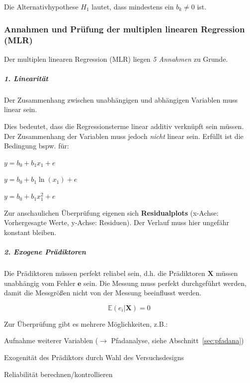 \documentclass{article}
\numberwithin{equation}{section}
\begin{document}
Die Alternativhypothese $H_1$ lautet, dass mindestens ein $b_k \neq 0$ ist.


\subsubsection{Annahmen und Prüfung der multiplen linearen Regression (MLR)}
\label{sec:annahmen-alm}

Der multiplen linearen Regression (MLR) liegen \emph{5 Annahmen} zu Grunde.

\subparagraph{1. Linearität}

Der Zusammenhang zwischen unabhängigen und abhängigen Variablen muss linear sein. 

Dies bedeutet, dass die Regressionsterme linear additiv verknüpft sein müssen. Der Zusammenhang der Variablen muss jedoch \emph{nicht} linear sein. Erfüllt ist die Bedingung bspw. für:

\begin{compactitem}
\item $y = b_0 + b_1 x_1 + e $
\item $y = b_0 + b_1 \ln(x_1) + e$
\item $y = b_0 + b_1 x_1^2 + e$
\end{compactitem}

Zur anschaulichen Überprüfung eigenen sich \textbf{Residualplots} (x-Achse: Vorhergesagte Werte, y-Achse: Residuen). Der Verlauf muss hier ungefähr konstant bleiben.

\subparagraph{2. Exogene Prädiktoren}

Die Prädiktoren müssen perfekt reliabel sein, d.h. die Prädiktoren $\mathbf{X}$ müssen unabhängig vom Fehler $\mathbf{e}$ sein. Die Messung muss perfekt durchgeführt werden, damit die Messgrößen nicht von der Messung beeinflusst werden.

\begin{equation}
\mathbb{E}(e_i|\mathbf{X}) = 0
\end{equation}

Zur Überprüfung gibt es mehrere Möglichkeiten, z.B.:

\begin{compactitem}
\item Aufnahme weiterer Variablen ($\to$ Pfadanalyse, siehe Abschnitt~\ref{sec:pfadana})
\item Exogenität des Prädiktors durch Wahl des Versuchsdesigns
\item Reliabilität berechnen/kontrollieren
\end{compactitem}
\end{document}
